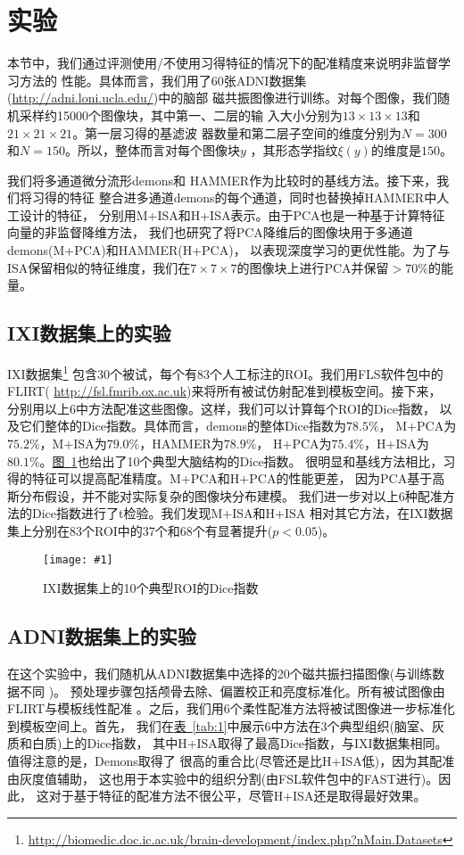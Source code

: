 \documentclass[a4paper]{article}
\newcommand{\addplot}[1]{\centering
	\texttt{[image: \#1]}}
\numberwithin{equation}{section}
\newcommand{\figref}[1]{\hyperref[fig:#1]{\figurename~\ref*{fig:#1}}}
\newcommand{\tabref}[1]{\hyperref[tab:#1]{\tablename~\ref*{tab:#1}}}
\renewcommand{\figurename}{图}
\renewcommand{\tablename}{表}
\begin{document}
\section{实验}
本节中，我们通过评测使用/不使用习得特征的情况下的配准精度来说明非监督学习方法的
性能。具体而言，我们用了60张ADNI数据集(\url{http://adni.loni.ucla.edu/})中的脑部
磁共振图像进行训练。对每个图像，我们随机采样约15000个图像块，其中第一、二层的输
入大小分别为$13\times 13 \times 13$和$21\times 21 \times 21$。第一层习得的基滤波
器数量和第二层子空间的维度分别为$N=300$和$N=150$。所以，整体而言对每个图像块$y$
，其形态学指纹$\xi(y)$的维度是$150$。

我们将多通道微分流形demons\cite{vercauteren2009diffeomorphic}和
HAMMER\cite{shen2007image}作为比较时的基线方法。接下来，我们将习得的特征
整合进多通道demons的每个通道，同时也替换掉HAMMER中人工设计的特征，
分别用M+ISA和H+ISA表示。由于PCA也是一种基于计算特征向量的非监督降维方法，
我们也研究了将PCA降维后的图像块用于多通道demons(M+PCA)和HAMMER(H+PCA)，
以表现深度学习的更优性能。为了与ISA保留相似的特征维度，我们在$7\times 7 \times
7$的图像块上进行PCA并保留$>70\%$的能量。

\subsection{IXI数据集上的实验}
IXI数据集\footnote{\url{http://biomedic.doc.ic.ac.uk/brain-development/index.php?nMain.Datasets}}
包含30个被试，每个有83个人工标注的ROI。我们用FLS软件包中的FLIRT(
\url{http://fsl.fmrib.ox.ac.uk})来将所有被试仿射配准到模板空间。接下来，
分别用以上6中方法配准这些图像。这样，我们可以计算每个ROI的Dice指数，
以及它们整体的Dice指数。具体而言，demons的整体Dice指数为$78.5\%$，
M+PCA为$75.2\%$，M+ISA为$79.0\%$，HAMMER为$78.9\%$，
H+PCA为$75.4\%$，H+ISA为$80.1\%$。\figref{4}也给出了10个典型大脑结构的Dice指数。
很明显和基线方法相比，习得的特征可以提高配准精度。M+PCA和H+PCA的性能更差，
因为PCA基于高斯分布假设，并不能对实际复杂的图像块分布建模。
我们进一步对以上6种配准方法的Dice指数进行了t检验。我们发现M+ISA和H+ISA
相对其它方法，在IXI数据集上分别在83个ROI中的37个和68个有显著提升($p<0.05$)。

\begin{figure}
    \addplot{res/fig4.png}
    \caption{IXI数据集上的10个典型ROI的Dice指数}
    \label{fig:4}
\end{figure}

\subsection{ADNI数据集上的实验}
在这个实验中，我们随机从ADNI数据集中选择的20个磁共振扫描图像(与训练数据不同 )。
预处理步骤包括颅骨去除、偏置校正和亮度标准化。所有被试图像由FLIRT与模板线性配准
。之后，我们用6个柔性配准方法将被试图像进一步标准化到模板空间上。首先，
我们在\tabref{1}中展示6中方法在3个典型组织(脑室、灰质和白质)上的Dice指数，
其中H+ISA取得了最高Dice指数，与IXI数据集相同。值得注意的是，Demons取得了
很高的重合比(尽管还是比H+ISA低)，因为其配准由灰度值辅助，
这也用于本实验中的组织分割(由FSL软件包中的FAST进行)。因此，
这对于基于特征的配准方法不很公平，尽管H+ISA还是取得最好效果。
\end{document}
